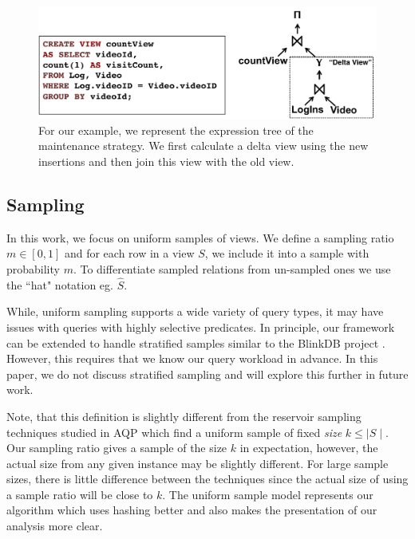 \begin{figure}[t] \vspace{-2em}
\centering
 \includegraphics[scale=0.35]{figs/example_expression_tree.pdf} \vspace{-.25em}
 \caption{For our example, we represent the expression tree of the maintenance strategy. We first calculate a delta view using the new insertions and then join this view with the old view.\label{exexpr}}\vspace{-1.75em}
\end{figure}

\subsection{Sampling}
In this work, we focus on uniform samples of views.
We define a sampling ratio $m\in [0,1]$ and for each row in a view $S$, we include it into a sample with probability $m$.
To differentiate sampled relations from un-sampled ones we use the ``hat" notation eg. $\hat{S}$. 

While, uniform sampling supports a wide variety of query types, it may have issues with queries with highly selective predicates.
In principle, our framework can be extended to handle stratified samples similar to the BlinkDB project \cite{AgarwalMPMMS13}.
However, this requires that we know our query workload in advance.  
In this paper, we do not discuss stratified sampling and will explore this further in future work.

\iffalse
Note, that this definition is slightly different from the reservoir sampling techniques studied in AQP \cite{DBLP:journals/toms/Vitter85} which find a uniform sample of fixed \emph{size} $k\le \mid S \mid$.
Our sampling ratio gives a sample of the size $k$ in expectation, however, the actual size from any given instance may be slightly different.
For large sample sizes, there is little difference between the techniques since the actual size of using a sample ratio will be close to $k$.
The uniform sample model represents our algorithm which uses hashing better and also makes the presentation of our analysis more clear.


